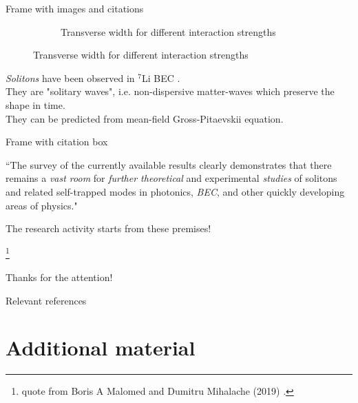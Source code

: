\documentclass[10pt, 
               aspectratio=169,
               headline=default]{beamer} %
\newcommand\nofoot[1]{%
  \begingroup
  \renewcommand\thefootnote{}\footnote{#1}%
  \addtocounter{footnote}{-1}%
  \endgroup
}
\begin{document}
\begin{frame}{Frame with images and citations}
\begin{figure}
\begin{subfigure}{0.40\textwidth}
				\caption{Transverse width for different interaction strengths}
				\vspace{30pt}
			\end{subfigure}
	\end{figure}
\begin{adjustwidth}{1cm}{1cm}
	\textit{Solitons} have been observed in $^7$Li BEC \cite{khaykovich2002formation}.\\
	They are "solitary waves", i.e. non-dispersive matter-waves which preserve the shape in time.\\
	They can be predicted from mean-field Gross-Pitaevskii equation.
	\end{adjustwidth}
\end{frame}

\begin{frame}{Frame with citation box}
\centering

\begin{minipage}{10cm}


    \begin{alertblock}{}
        ``The survey of the currently available results clearly demonstrates that there
        remains a \textit{vast room} for \textit{further theoretical} and experimental \textit{studies} of solitons and
        related self-trapped modes in photonics, \textit{BEC}, and other quickly developing areas of
        physics."
    \end{alertblock}
\end{minipage}

\begin{minipage}{11cm}
	\centering
	\vspace{20pt}
	The research activity starts from these premises!
	\vspace{20pt}
\end{minipage}
\nofoot{quote from Boris A Malomed and Dumitru Mihalache (2019) \cite{malomed2019nonlinear}.}
\end{frame}

\begin{frame}
	\centering
	\Huge{Thanks for the attention!}
\end{frame}

\begin{frame}[allowframebreaks]{Relevant references}
	\printbibliography
\end{frame}

\section*{Additional material}
\end{document}
